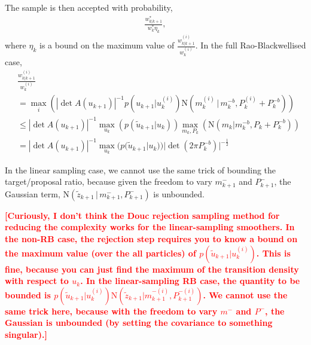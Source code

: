 \documentclass[twocolumn]{autart}    %
\newcommand{\comment}[1]{\textcolor{red}{\textbf{[#1]}}}
\begin{document}
The sample is then accepted with probability,
%
\begin{equation}
\begin{split}
  \frac{ w_{k|k+1}^* }{ w_k^* \eta_k }     ,
\end{split}
\end{equation}
%
where $\eta_k$ is a bound on the maximum value of $\frac{ w_{k|k+1}^{(i)} }{ w_k^{(i)} }$. In the full Rao-Blackwellised case,
%
\begin{equation}
\begin{split}
  & \frac{ w_{k|k+1}^{(i)} }{ w_k^{(i)} } \\
  & = \max_i( |\det A(u_{k+1})|^{-1} p(u_{k+1} | u_{k}^{(i)}) \mathrm{N}(m_k^{(i)}\,|\,m^{-b}_{k},P_k^{(i)}+P^{-b}_{k})) \\
  & \le |\det A(u_{k+1})|^{-1} \max_{u_k}( p(\tilde{u}_{k+1} | u_k) ) \max_{m_k,P_k}( \mathrm{N}(m_k | m^{-b}_{k},P_k+P^{-b}_{k}) ) \\
  & = |\det A(u_{k+1})|^{-1} \max_{u_k}( p(\tilde{u}_{k+1} | u_k) ) |\det(2 \pi P^{-b}_{k})|^{-\frac{1}{2}} 
\end{split}
\end{equation}

In the linear sampling case, we cannot use the same trick of bounding the target/proposal ratio, because given the freedom to vary $m^{-}_{k+1}$ and $P^{-}_{k+1}$, the Gaussian term, $\mathrm{N}(\tilde{z}_{k+1}\,|\, m^{-}_{k+1}, P^{-}_{k+1})$ is unbounded.

\comment{Curiously, I don't think the Douc rejection sampling method for reducing the complexity works for the linear-sampling smoothers. In the non-RB case, the rejection step requires you to know a bound on the maximum value (over the all particles) of $p(\tilde{u}_{k+1}|u_k^{(i)})$. This is fine, because you can just find the maximum of the transition density with respect to $u_k$. In the linear-sampling RB case, the quantity to be bounded is $p(\tilde{u}_{k+1}|u_k^{(i)}) \mathrm{N}(\tilde{z}_{k+1}|m^{-(i)}_{k+1}, P^{-(i)}_{k+1})$. We cannot use the same trick here, because with the freedom to vary $m^-$ and $P^-$, the Gaussian is unbounded (by setting the covariance to something singular).}

%
\end{document}
